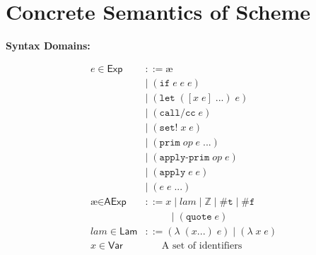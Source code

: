 \documentclass[12pt,draft]{article}
\newcommand\mae{\ensuremath{\text{\ae}}}
\newcommand{\lamsyn}[2]{(\lambda\;(#1 ...)\;#2)}
\newcommand{\vararglamsyn}[2]{(\lambda\;#1\;#2)}
\newcommand{\letsyn}[3]{(\texttt{let}\;([#1\;#2]\;...)\;#3)}
\newcommand{\ifsyn}[3]{(\texttt{if}\;#1\;#2\;#3)}
\newcommand{\primsyn}[2]{(\texttt{prim}\;#1\;#2\;...)}
\newcommand{\applyprimsyn}[2]{(\texttt{apply-prim}\;#1\;#2)}
\newcommand{\applysyn}[2]{(\texttt{apply}\;#1\;#2)}
\newcommand{\callccsyn}[1]{(\texttt{call/cc}\;#1)}
\newcommand{\setsyn}[2]{(\texttt{set!}\;#1\;#2)}
\newcommand{\quotesyn}[1]{(\texttt{quote}\;#1)}
\newcommand{\truesyn}{\texttt{\#t}}
\newcommand{\falsesyn}{\texttt{\#f}}
\begin{document}


\section{Concrete Semantics of Scheme}

{\footnotesize
\begin{multicols*}{2}
\begin{center}
\textbf{Syntax Domains:}
\end{center}
\vspace{-16mm}
\begin{center}
\begin{align*}
  e \in \textsf{Exp} &::= \mae \\
                     &|\; \ifsyn{e}{e}{e} \\
                     &|\; \letsyn{x}{e}{e} \\
                     &|\; \callccsyn{e} \\
                     &|\; \setsyn{x}{e} \\
                     &|\; \primsyn{op}{e} \\
                     &|\; \applyprimsyn{op}{e} \\
                     &|\; \applysyn{e}{e} \\
                     &|\; (e\;e\;...) \\
  \mae \in \textsf{AExp} &::= x\;|\; lam\;|\; \mathbb{Z}
                           \;|\; \truesyn \;|\; \falsesyn \\
                   &\;\;\;\;\;\;\;\;\;\, |\; \quotesyn{e} \\
  lam \in \textsf{Lam} &::= \lamsyn{x}{e} \;|\; \vararglamsyn{x}{e} \\
  x \in \textsf{Var} &\;\;\;\;\;\; \text{A set of identifiers} \\

\end{align*}
\end{center}
\end{multicols*}}
\end{document}
